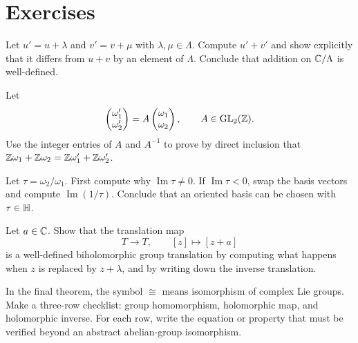 \section*{Exercises}

\begin{exercise}
Let \(u'=u+\lambda\) and \(v'=v+\mu\) with \(\lambda,\mu\in\Lambda\).  Compute
\(u'+v'\) and show explicitly that it differs from \(u+v\) by an element of
\(\Lambda\).  Conclude that addition on \(\mathbb{C}/\Lambda\) is well-defined.
\end{exercise}

\begin{exercise}
Let
\[
  \begin{pmatrix}\omega'_1\\ \omega'_2\end{pmatrix}
  =
  A\begin{pmatrix}\omega_1\\ \omega_2\end{pmatrix},
  \qquad A\in\operatorname{GL}_2(\mathbb{Z}).
\]
Use the integer entries of \(A\) and \(A^{-1}\) to prove by direct inclusion
that \(\mathbb{Z}\omega_1+\mathbb{Z}\omega_2=\mathbb{Z}\omega'_1+\mathbb{Z}\omega'_2\).
\end{exercise}

\begin{exercise}
Let \(\tau=\omega_2/\omega_1\).  First compute why \(\operatorname{Im}\tau\ne0\).
If \(\operatorname{Im}\tau<0\), swap the basis vectors and compute
\(\operatorname{Im}(1/\tau)\).  Conclude that an oriented basis can be chosen
with \(\tau\in\mathbb{H}\).
\end{exercise}

\begin{exercise}
Let \(a\in\mathbb{C}\).  Show that the translation map
\[
  T\longrightarrow T,\qquad [z]\longmapsto [z+a]
\]
is a well-defined biholomorphic group translation by computing what happens when
\(z\) is replaced by \(z+\lambda\), and by writing down the inverse translation.
\end{exercise}

\begin{exercise}
In the final theorem, the symbol \(\cong\) means isomorphism of complex Lie
groups.  Make a three-row checklist: group homomorphism, holomorphic map, and
holomorphic inverse.  For each row, write the equation or property that must be
verified beyond an abstract abelian-group isomorphism.
\end{exercise}
